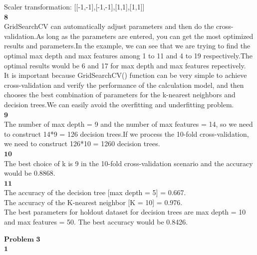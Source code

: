 \documentclass[12pt]{article}
\begin{document}
Scaler transformation: [[-1,-1],[-1,-1],[1,1],[1,1]]\\

$\textbf{8}$\\

GridSearchCV can automatically adjust parameters and then do the cross-validation.As long as the parameters are entered, you can get the most optimized results and parameters.In the example, we can see that we are trying to find the optimal max depth and max features among 1 to 11 and 4 to 19 respectively.The optimal results would be 6 and 17 for max depth and max features repectively.\\

It is important because GridSearchCV() function can be very simple to achieve cross-validation and verify the performance of the calculation model, and then chooses the best combination of parameters for the k-nearest neighbors and decision trees.We can easily avoid the overfitting and underfitting problem.\\

$\textbf{9}$\\

The number of max depth = 9 and the number of max features = 14, so we need to construct 14*9 = 126 decision trees.If we process the 10-fold cross-validation, we need to construct 126*10 = 1260 decision trees.\\


$\textbf{10}$\\

The best choice of k is 9 in the 10-fold cross-validation scenario and the accuracy would be 0.8868.\\

$\textbf{11}$\\

The accuracy of the decision tree [max depth = 5] = 0.667.\\

The accuracy of the K-nearest neighbor [K = 10] = 0.976.\\

The best parameters for holdout
dataset for decision trees are max depth = 10 and max features = 50. The best accuracy would be 0.8426.\\

\newpage

$\textbf{Problem 3}$\\

$\textbf{1}$\\
\end{document}
